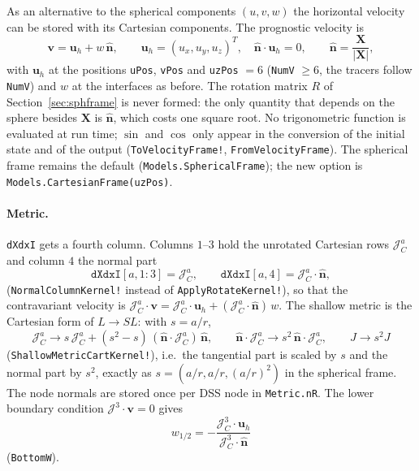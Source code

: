 \documentclass[11pt,a4paper]{article}
\newcommand{\vv}{\bm{v}}
\newcommand{\Jm}{\mathcal{J}}
\newcommand{\code}[1]{\texttt{#1}}
\begin{document}
As an alternative to the spherical components $(u,v,w)$ the horizontal
velocity can be stored with its Cartesian components. The prognostic
velocity is
\begin{equation}
  \vv = \bm u_h + w\,\hat{\bm n},\qquad
  \bm u_h = (u_x,u_y,u_z)^T,\quad \hat{\bm n}\cdot\bm u_h = 0,\qquad
  \hat{\bm n} = \frac{\bm X}{|\bm X|},
\end{equation}
with $\bm u_h$ at the positions \code{uPos}, \code{vPos} and
\code{uzPos} $=6$ (\code{NumV} $\ge 6$, the tracers follow \code{NumV}) and
$w$ at the interfaces as before. The rotation matrix $R$ of
Section~\ref{sec:sphframe} is never formed: the only quantity that depends
on the sphere besides $\bm X$ is $\hat{\bm n}$, which costs one square root.
No trigonometric function is evaluated at run time; $\sin$ and $\cos$ only
appear in the conversion of the initial state and of the output
(\code{ToVelocityFrame!}, \code{FromVelocityFrame}). The spherical frame
remains the default (\code{Models.SphericalFrame}); the new option is
\code{Models.CartesianFrame(uzPos)}.

\paragraph{Metric.}
\code{dXdxI} gets a fourth column. Columns $1$--$3$ hold the unrotated
Cartesian rows $\Jm^a_C$ and column $4$ the normal part
\begin{equation}
  \code{dXdxI}[a,1{:}3] = \Jm^a_C,\qquad
  \code{dXdxI}[a,4] = \Jm^a_C\cdot\hat{\bm n},
\end{equation}
(\code{NormalColumnKernel!} instead of \code{ApplyRotateKernel!}), so that the
contravariant velocity is
$\Jm^a_C\cdot\vv = \Jm^a_C\cdot\bm u_h + (\Jm^a_C\cdot\hat{\bm n})\,w$.
The shallow metric is the Cartesian form of $L\to SL$: with $s = a/r$,
\begin{equation}
  \Jm^a_C \to s\,\Jm^a_C + (s^2-s)\,(\hat{\bm n}\cdot\Jm^a_C)\,\hat{\bm n},\qquad
  \hat{\bm n}\cdot\Jm^a_C \to s^2\,\hat{\bm n}\cdot\Jm^a_C,\qquad
  J\to s^2 J
\end{equation}
(\code{ShallowMetricCartKernel!}), i.e.\ the tangential part is scaled by
$s$ and the normal part by $s^2$, exactly as $s = (a/r,a/r,(a/r)^2)$ in the
spherical frame. The node normals are stored once per DSS node in
\code{Metric.nR}. The lower boundary condition $\Jm^3\cdot\vv = 0$ gives
\begin{equation}
  w_{1/2} = -\frac{\Jm^3_C\cdot\bm u_h}{\Jm^3_C\cdot\hat{\bm n}}
\end{equation}
(\code{BottomW}).
\end{document}
